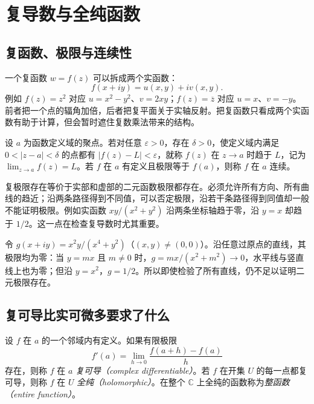 \setcounter{chapter}{2} %
\chapter{复导数与全纯函数}
\label{chap:ca-derivative}

\section{复函数、极限与连续性}

一个复函数 $w=f(z)$ 可以拆成两个实函数：
\[
 f(x+iy)=u(x,y)+iv(x,y).
\]
例如 $f(z)=z^2$ 对应 $u=x^2-y^2$、$v=2xy$；$f(z)=\overline z$ 对应 $u=x$、$v=-y$。前者把一个点的辐角加倍，后者把复平面关于实轴反射。把复函数只看成两个实函数有助于计算，但会暂时遮住复数乘法带来的结构。

\begin{definition}[复极限]
设 $a$ 为函数定义域的聚点。若对任意 $\varepsilon>0$，存在 $\delta>0$，使定义域内满足 $0<|z-a|<\delta$ 的点都有 $|f(z)-L|<\varepsilon$，就称 $f(z)$ 在 $z\to a$ 时趋于 $L$，记为 $\lim_{z\to a}f(z)=L$。若 $f$ 在 $a$ 有定义且极限等于 $f(a)$，则称 $f$ 在 $a$ 连续。
\end{definition}

复极限存在等价于实部和虚部的二元函数极限都存在。必须允许所有方向、所有曲线的趋近；沿两条路径得到不同值，可以否定极限，沿若干条路径得到同值却一般不能证明极限。例如实函数 $xy/(x^2+y^2)$ 沿两条坐标轴趋于零，沿 $y=x$ 却趋于 $1/2$。这一点在检查复导数时尤其重要。

\begin{example}[路径检验的限度]
令 $g(x+iy)=x^2y/(x^4+y^2)$（$(x,y)\ne(0,0)$）。沿任意过原点的直线，其极限均为零：当 $y=mx$ 且 $m\ne0$ 时，$g=mx/(x^2+m^2)\to0$，水平线与竖直线上也为零；但沿 $y=x^2$，$g=1/2$。所以即使检验了所有直线，仍不足以证明二元极限存在。
\end{example}

\section{复可导比实可微多要求了什么}

\begin{definition}[复导数与全纯性]
设 $f$ 在 $a$ 的一个邻域内有定义。如果有限极限
\begin{equation}
 f'(a)=\lim_{h\to0}\frac{f(a+h)-f(a)}{h}
 \label{eq:ca-derivative}
\end{equation}
存在，则称 $f$ 在 $a$ \emph{复可导（complex differentiable）}。若 $f$ 在开集 $U$ 的每一点都复可导，则称 $f$ 在 $U$ \emph{全纯（holomorphic）}。在整个 $\mathbb C$ 上全纯的函数称为\emph{整函数（entire function）}。
\end{definition}

